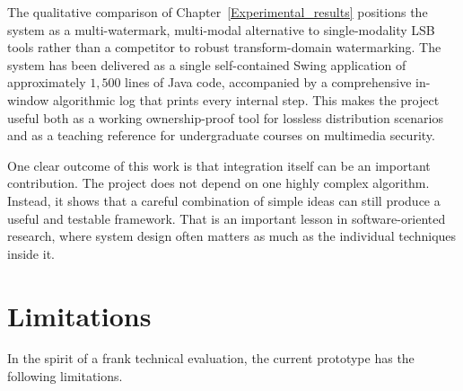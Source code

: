 The qualitative comparison of Chapter~\ref{Experimental_results} positions the system as a multi-watermark, multi-modal alternative to single-modality LSB tools rather than a competitor to robust transform-domain watermarking. The system has been delivered as a single self-contained Swing application of approximately $1{,}500$ lines of Java code, accompanied by a comprehensive in-window algorithmic log that prints every internal step. This makes the project useful both as a working ownership-proof tool for lossless distribution scenarios and as a teaching reference for undergraduate courses on multimedia security.

One clear outcome of this work is that integration itself can be an important contribution. The project does not depend on one highly complex algorithm. Instead, it shows that a careful combination of simple ideas can still produce a useful and testable framework. That is an important lesson in software-oriented research, where system design often matters as much as the individual techniques inside it.

\section{Limitations}

In the spirit of a frank technical evaluation, the current prototype has the following limitations.

